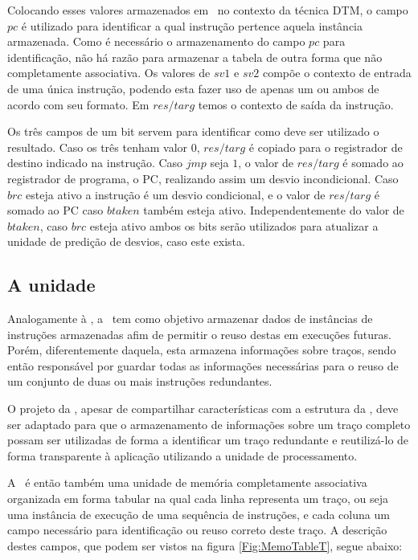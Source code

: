 Colocando esses valores armazenados em \tableg\ no contexto da técnica DTM, o campo $pc$ é utilizado para identificar a qual instrução pertence aquela instância armazenada. Como é necessário o armazenamento do campo $pc$ para identificação, não há razão para armazenar a tabela de outra forma que não completamente associativa. Os valores de $sv1$ e $sv2$ compõe o contexto de entrada de uma única instrução, podendo esta fazer uso de apenas um ou ambos de acordo com seu formato. Em $res/targ$ temos o contexto de saída da instrução.

Os três campos de um bit servem para identificar como deve ser utilizado o resultado. Caso os três tenham valor $0$, $res/targ$ é copiado para o registrador de destino indicado na instrução. Caso $jmp$ seja $1$, o valor de $res/targ$ é somado ao registrador de programa, o PC, realizando assim um desvio incondicional. Caso $brc$ esteja ativo a instrução é um desvio condicional, e o valor de $res/targ$ é somado ao PC caso $btaken$ também esteja ativo. Independentemente do valor de $btaken$, caso $brc$ esteja ativo ambos os bits serão utilizados para atualizar a unidade de predição de desvios, caso este exista.

\subsection{A unidade \tablet}
\label{Fundamentacao:DTMHardware:TableT}

Analogamente à \tableg, a \tablet\ tem como objetivo armazenar dados de instâncias de instruções armazenadas afim de permitir o reuso destas em execuções futuras. Porém, diferentemente daquela, esta armazena informações sobre traços, sendo então responsável por guardar todas as informações necessárias para o reuso de um conjunto de duas ou mais instruções redundantes.

O projeto da \tablet, apesar de compartilhar características com a estrutura da \tableg, deve ser adaptado para que o armazenamento de informações sobre um traço completo possam ser utilizadas de forma a identificar um traço redundante e reutilizá-lo de forma transparente à aplicação utilizando a unidade de processamento. 

A \tablet\ é então também uma unidade de memória completamente associativa organizada em forma tabular na qual cada linha representa um traço, ou seja uma instância de execução de uma sequência de instruções, e cada coluna um campo necessário para identificação ou reuso correto deste traço. A descrição destes campos, que podem ser vistos na figura \ref{Fig:MemoTableT}, segue abaixo:

